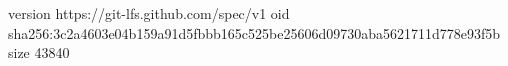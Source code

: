version https://git-lfs.github.com/spec/v1
oid sha256:3c2a4603e04b159a91d5fbbb165c525be25606d09730aba5621711d778e93f5b
size 43840
